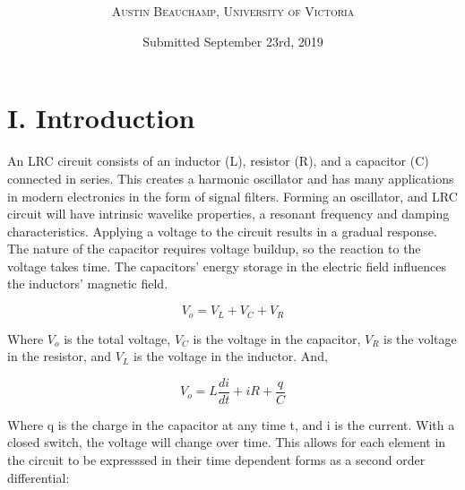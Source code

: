 \documentclass[twocolumn, letterpaper, 10pt, twoside]{article}
\title{\vspace{-10mm}\fontsize{15pt}{10pt}\selectfont\textbf{\thetitle}\vspace{-3mm}} %
\author{
	\large
	{\textsc{Austin Beauchamp, University of Victoria}}\\[-7mm]}
\date{Submitted September 23rd, 2019}
\begin{document}

    \section*{I. Introduction}
 
 An LRC circuit consists of an inductor (L), resistor (R), and a capacitor (C) connected in series. This creates a harmonic oscillator and has many applications in modern electronics in the form of signal filters. Forming an oscillator, and LRC circuit will have intrinsic wavelike properties, a resonant frequency and damping characteristics.  
 Applying a voltage to the circuit results in a gradual response. The nature of the capacitor requires voltage buildup, so the reaction to the voltage takes time. The capacitors' energy storage in the electric field influences the inductors' magnetic field. 
 
 
 \begin{equation}
 V_o = V_L + V_C + V_R
 \end{equation}
 
 Where $V_o$ is the total voltage, $V_C$ is the voltage in the capacitor, $V_R$ is the voltage in the resistor, and $V_L$ is the voltage in the inductor. And, 
 
  \begin{equation}
 V_o = L\frac{di}{dt} + iR + \frac{q}{C}
 \end{equation}
 
 Where q is the charge in the capacitor at any time t, and i is the current. With a closed switch, the voltage will change over time. This allows for each element in the circuit to be expresssed in their time dependent forms as a second order differential: 
 
\end{document}

